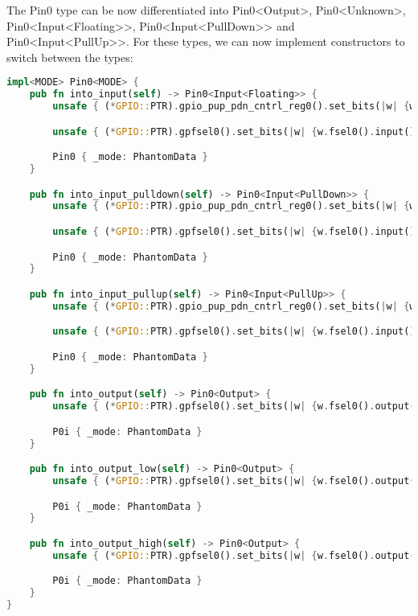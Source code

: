 The Pin0 type can be now differentiated into Pin0<Output>, Pin0<Unknown>, Pin0<Input<Floating>>, Pin0<Input<PullDown>> and Pin0<Input<PullUp>>.
For these types, we can now implement constructors to switch between the types:

\begin{lstlisting}[language=Rust,style=colouredRust]
impl<MODE> Pin0<MODE> {
    pub fn into_input(self) -> Pin0<Input<Floating>> {
        unsafe { (*GPIO::PTR).gpio_pup_pdn_cntrl_reg0().set_bits(|w| {w.gpio_pup_pdn_cntrl0().none()})}

        unsafe { (*GPIO::PTR).gpfsel0().set_bits(|w| {w.fsel0().input()}) };

        Pin0 { _mode: PhantomData }
    }

    pub fn into_input_pulldown(self) -> Pin0<Input<PullDown>> {
        unsafe { (*GPIO::PTR).gpio_pup_pdn_cntrl_reg0().set_bits(|w| {w.gpio_pup_pdn_cntrl0().down()})}

        unsafe { (*GPIO::PTR).gpfsel0().set_bits(|w| {w.fsel0().input()}) };

        Pin0 { _mode: PhantomData }
    }

    pub fn into_input_pullup(self) -> Pin0<Input<PullUp>> {
        unsafe { (*GPIO::PTR).gpio_pup_pdn_cntrl_reg0().set_bits(|w| {w.gpio_pup_pdn_cntrl0().up()})}

        unsafe { (*GPIO::PTR).gpfsel0().set_bits(|w| {w.fsel0().input()}) };

        Pin0 { _mode: PhantomData }
    }

    pub fn into_output(self) -> Pin0<Output> {
        unsafe { (*GPIO::PTR).gpfsel0().set_bits(|w| {w.fsel0().output()})}

        P0i { _mode: PhantomData }
    }

    pub fn into_output_low(self) -> Pin0<Output> {
        unsafe { (*GPIO::PTR).gpfsel0().set_bits(|w| {w.fsel0().output()})}

        P0i { _mode: PhantomData }
    }

    pub fn into_output_high(self) -> Pin0<Output> {
        unsafe { (*GPIO::PTR).gpfsel0().set_bits(|w| {w.fsel0().output()})}

        P0i { _mode: PhantomData }
    }
}
\end{lstlisting}

